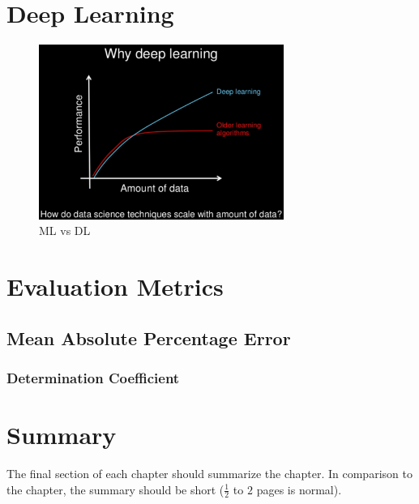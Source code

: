 \section{Deep Learning}
\label{s:Second-Background-Deep-Learning}

\begin{figure}[t]
\centering
\includegraphics[width=8cm]{figures/MlvsDL-data-amount.png}
\caption{ML vs DL}
\label{f:ML-vs-DL}
\end{figure}

\section{Evaluation Metrics}
\label{sec:section_Example}
\subsection{Mean Absolute Percentage Error}
\subsubsection{Determination Coefficient}

\section{Summary}
\label{s:Background-Summary}

The final section of each chapter should summarize the chapter. In comparison to the chapter, the summary should be short ($\frac{1}{2}$ to $2$ pages is normal).


